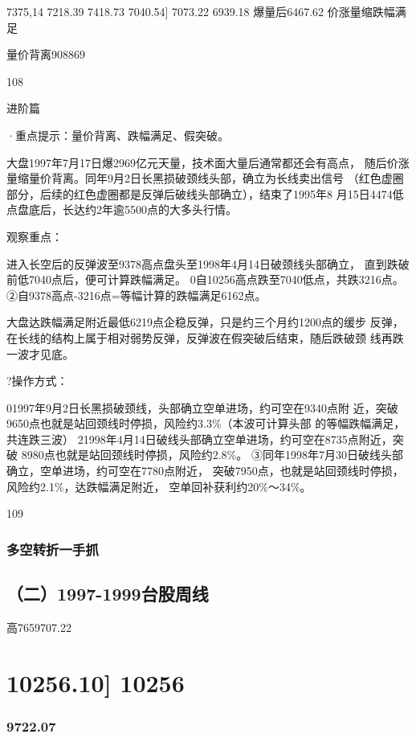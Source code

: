 \documentclass{article}
\begin{document}
7375,14 7218.39 7418.73 7040.54] 7073.22 6939.18 爆量后6467.62 价涨量缩跌幅满足

量价背离908869

108

\clearpage

进阶篇

·重点提示：量价背离、跌幅满足、假突破。

大盘1997年7月17日爆2969亿元天量，技术面大量后通常都还会有高点， 随后价涨量缩量价背离。同年9月2日长黑损破颈线头部，确立为长线卖出信号 （红色虚圈部分，后续的红色虚圈都是反弹后破线头部确立），结束了1995年8 月15日4474低点盘底后，长达约2年逾5500点的大多头行情。

观察重点：

进入长空后的反弹波至9378高点盘头至1998年4月14日破颈线头部确立， 直到跌破前低7040点后，便可计算跌幅满足。 0自10256高点跌至7040低点，共跌3216点。 ②自9378高点-3216点=等幅计算的跌幅满足6162点。

大盘达跌幅满足附近最低6219点企稳反弹，只是约三个月约1200点的缓步 反弹，在长线的结构上属于相对弱势反弹，反弹波在假突破后结束，随后跌破颈 线再跌一波才见底。

?操作方式：

01997年9月2日长黑损破颈线，头部确立空单进场，约可空在9340点附 近，突破9650点也就是站回颈线时停损，风险约3.3\%（本波可计算头部 的等幅跌幅满足，共连跌三波） 21998年4月14日破线头部确立空单进场，约可空在8735点附近，突破 8980点也就是站回颈线时停损，风险约2.8\%。 ③同年1998年7月30日破线头部确立，空单进场，约可空在7780点附近， 突破7950点，也就是站回颈线时停损，风险约2.1\%，达跌幅满足附近， 空单回补获利约20\%～34\%。

109

\clearpage

\subsubsection{多空转折一手抓}

\subsection{（二）1997-1999台股周线}

高7659707.22

\section{10256.10] 10256}

\subsubsection{9722.07}
\end{document}
